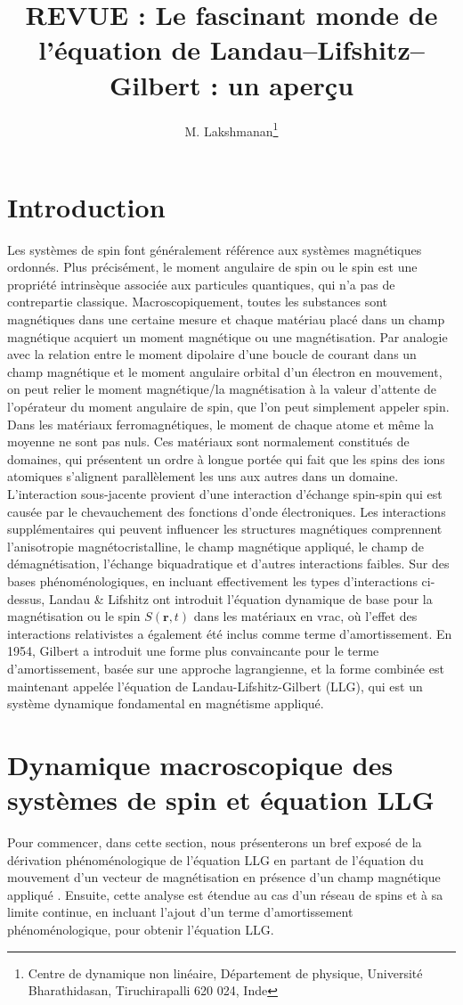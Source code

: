 \documentclass{article}
\title{REVUE : Le fascinant monde de l'équation de Landau–Lifshitz–Gilbert : un aperçu}
\author{M. Lakshmanan\thanks{Centre de dynamique non linéaire, Département de physique, Université Bharathidasan, Tiruchirapalli 620 024, Inde}}
\date{}
\begin{document}
	
	\maketitle
	
	\section{Introduction}
	Les systèmes de spin font généralement référence aux systèmes magnétiques ordonnés. Plus précisément, le moment angulaire de spin ou le spin est une propriété intrinsèque associée aux particules quantiques, qui n'a pas de contrepartie classique. Macroscopiquement, toutes les substances sont magnétiques dans une certaine mesure et chaque matériau placé dans un champ magnétique acquiert un moment magnétique ou une magnétisation. Par analogie avec la relation entre le moment dipolaire d'une boucle de courant dans un champ magnétique et le moment angulaire orbital d'un électron en mouvement, on peut relier le moment magnétique/la magnétisation à la valeur d'attente de l'opérateur du moment angulaire de spin, que l'on peut simplement appeler spin. Dans les matériaux ferromagnétiques, le moment de chaque atome et même la moyenne ne sont pas nuls. Ces matériaux sont normalement constitués de domaines, qui présentent un ordre à longue portée qui fait que les spins des ions atomiques s'alignent parallèlement les uns aux autres dans un domaine. L'interaction sous-jacente \cite{reference} provient d'une interaction d'échange spin-spin qui est causée par le chevauchement des fonctions d'onde électroniques. Les interactions supplémentaires qui peuvent influencer les structures magnétiques comprennent l'anisotropie magnétocristalline, le champ magnétique appliqué, le champ de démagnétisation, l'échange biquadratique et d'autres interactions faibles. Sur des bases phénoménologiques, en incluant effectivement les types d'interactions ci-dessus, Landau \& Lifshitz \cite{landau} ont introduit l'équation dynamique de base pour la magnétisation ou le spin $S(\mathbf{r}, t)$ dans les matériaux en vrac, où l'effet des interactions relativistes a également été inclus comme terme d'amortissement. En 1954, Gilbert \cite{gilbert} a introduit une forme plus convaincante pour le terme d'amortissement, basée sur une approche lagrangienne, et la forme combinée est maintenant appelée l'équation de Landau-Lifshitz-Gilbert (LLG), qui est un système dynamique fondamental en magnétisme appliqué. 
	
	\section{Dynamique macroscopique des systèmes de spin et équation LLG}
	Pour commencer, dans cette section, nous présenterons un bref exposé de la dérivation phénoménologique de l'équation LLG en partant de l'équation du mouvement d'un vecteur de magnétisation en présence d'un champ magnétique appliqué \cite{landau}. Ensuite, cette analyse est étendue au cas d'un réseau de spins et à sa limite continue, en incluant l'ajout d'un terme d'amortissement phénoménologique, pour obtenir l'équation LLG.	
\end{document}
